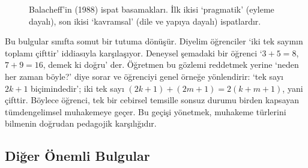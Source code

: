 \begin{figure}[h]
\centering
{}%
\caption{Balacheff’in (1988) ispat basamakları. İlk ikisi ‘pragmatik’ (eyleme dayalı), son ikisi ‘kavramsal’ (dile ve yapıya dayalı) ispatlardır.}
\end{figure}

Bu bulgular sınıfta somut bir tutuma dönüşür. Diyelim öğrenciler ‘iki tek sayının toplamı çifttir’ iddiasıyla karşılaşıyor. Deneysel şemadaki bir öğrenci ‘$3+5=8$, $7+9=16$, demek ki doğru’ der. Öğretmen bu gözlemi reddetmek yerine ‘neden her zaman böyle?’ diye sorar ve öğrenciyi genel örneğe yönlendirir: ‘tek sayı $2k+1$ biçimindedir’; iki tek sayı $(2k+1)+(2m+1)=2(k+m+1)$, yani çifttir. Böylece öğrenci, tek bir cebirsel temsille sonsuz durumu birden kapsayan tümdengelimsel muhakemeye geçer. Bu geçişi yönetmek, muhakeme türlerini bilmenin doğrudan pedagojik karşılığıdır.

\subsection{Diğer Önemli Bulgular}

